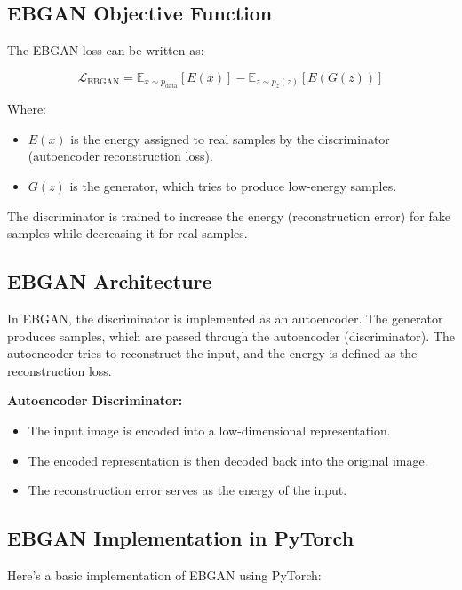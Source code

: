 \subsection{EBGAN Objective Function}
The EBGAN loss can be written as:

\[
\mathcal{L}_{\text{EBGAN}} = \mathbb{E}_{x \sim p_{\text{data}}} [E(x)] - \mathbb{E}_{z \sim p_z(z)} [E(G(z))]
\]

Where:
\begin{itemize}
    \item \( E(x) \) is the energy assigned to real samples by the discriminator (autoencoder reconstruction loss).
    \item \( G(z) \) is the generator, which tries to produce low-energy samples.
\end{itemize}

The discriminator is trained to increase the energy (reconstruction error) for fake samples while decreasing it for real samples.

\subsection{EBGAN Architecture}
In EBGAN, the discriminator is implemented as an autoencoder. The generator produces samples, which are passed through the autoencoder (discriminator). The autoencoder tries to reconstruct the input, and the energy is defined as the reconstruction loss.

\textbf{Autoencoder Discriminator:}
\begin{itemize}
    \item The input image is encoded into a low-dimensional representation.
    \item The encoded representation is then decoded back into the original image.
    \item The reconstruction error serves as the energy of the input.
\end{itemize}

\subsection{EBGAN Implementation in PyTorch}
Here's a basic implementation of EBGAN using PyTorch:

